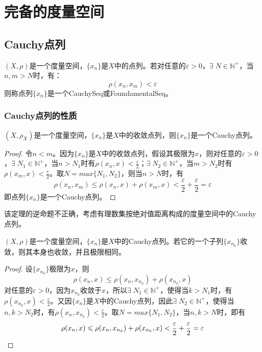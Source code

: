 \section{完备的度量空间}
\subsection{Cauchy点列}
\begin{definition}
	$(X,\rho)$是一个度量空间，$\{x_n\}$是$X$中的点列。若对任意的$\varepsilon>0$，$\exists\;N\in\mathbb{N}^+$，当$n,m>N$时，有：
	\begin{equation*}
		\rho(x_n,x_m)<\varepsilon
	\end{equation*}
	则称点列$\{x_n\}$是一个\gls{CauchySeq}或\gls{FoundamentalSeq}。
\end{definition}
\subsubsection{Cauchy点列的性质}
\begin{theorem}
	$(X,\rho_X)$是一个度量空间，$\{x_n\}$是$X$中的收敛点列，则$\{x_n\}$是一个Cauchy点列。
\end{theorem}
\begin{proof}
	令$n<m$。因为$\{x_n\}$是$X$中的收敛点列，假设其极限为$x$，则对任意的$\varepsilon>0$，$\exists\; N_1\in\mathbb{N}^+$，当$n>N_1$时有$\rho(x_n,x)<\frac{\varepsilon}{2}$；$\exists\; N_2\in\mathbb{N}^+$，当$m>N_2$时有$\rho(x_m,x)<\frac{\varepsilon}{2}$。取$N=max\{N_1,N_2\}$，则当$n>N$时，有
	\begin{equation*}
		\rho(x_n,x_m)\leqslant\rho(x_n,x)+\rho(x_m,x)<\frac{\varepsilon}{2}+\frac{\varepsilon}{2}=\varepsilon
	\end{equation*}
	即点列$\{x_n\}$是一个Cauchy点列。
\end{proof}
该定理的逆命题不正确，考虑有理数集按绝对值距离构成的度量空间中的Cauchy点列。
\begin{theorem}
	$(X,\rho)$是一个度量空间，$\{x_n\}$是$X$中的Cauchy点列。若它的一个子列$\{x_{n_k}\}$收敛，则其本身也收敛，并且极限相同。
\end{theorem}
\begin{proof}
	设$\{x_{n_k}\}$极限为$x$，则
	\begin{equation*}
		\rho(x_n,x)\leqslant\rho(x_n,x_{n_k})+\rho(x_{n_k},x)
	\end{equation*}
	对任意的$\varepsilon>0$，因为$x_{n_k}$收敛于$x$，所以$\exists\;N_1\in\mathbb{N}^+$，使得当$k>N_1$时，有$\rho(x_{n_k},x)<\frac{\varepsilon}{2}$。又因$\{x_n\}$是$X$中的Cauchy点列，因此$\exists\;N_2\in\mathbb{N}^+$，使得当$n,k>N_2$时，有$\rho(x_n,x_{n_k})<\frac{\varepsilon}{2}$。取$N=max\{N_1,N_2\}$，当$n,k>N$时，即有
	\begin{equation*}
		\rho(x_n,x)\leqslant\rho(x_n,x_{n_k})+\rho(x_{n_k},x)<\frac{\varepsilon}{2}+\frac{\varepsilon}{2}=\varepsilon\qedhere
	\end{equation*}
\end{proof}
